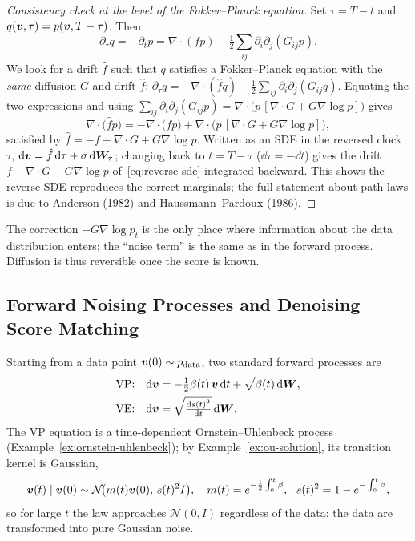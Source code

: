 \begin{proof}[Consistency check at the level of the Fokker--Planck equation]
Set $\tau=T-t$ and $q(\bm{v},\tau)=p(\bm{v},T-\tau)$. Then
\[
\partial_\tau q=-\partial_tp=\nabla\!\cdot(fp)-\tfrac12\sum_{ij}\partial_i\partial_j(G_{ij}p).
\]
We look for a drift $\hat f$ such that $q$ satisfies a Fokker--Planck equation with the \emph{same} diffusion $G$ and drift $\hat f$:
$\partial_\tau q=-\nabla\!\cdot(\hat fq)+\tfrac12\sum_{ij}\partial_i\partial_j(G_{ij}q)$. Equating the two expressions and using $\sum_{ij}\partial_i\partial_j(G_{ij}p)=\nabla\!\cdot\big(p\,[\nabla\!\cdot G+G\nabla\log p]\big)$ gives
\[
\nabla\!\cdot\big(\hat fp\big)=-\nabla\!\cdot\big(fp\big)+\nabla\!\cdot\big(p\,[\nabla\!\cdot G+G\nabla\log p]\big),
\]
satisfied by $\hat f=-f+\nabla\!\cdot G+G\nabla\log p$. Written as an SDE in the reversed clock $\tau$, $\mathrm{d}\bm{v}=\hat f\,\mathrm{d}\tau+\sigma\,\mathrm{d}\bm{W}_\tau$; changing back to $t=T-\tau$ ($\dd\tau=-\dd t$) gives the drift $f-\nabla\!\cdot G-G\nabla\log p$ of~\eqref{eq:reverse-sde} integrated backward. This shows the reverse SDE reproduces the correct marginals; the full statement about path laws is due to Anderson (1982) and Haussmann--Pardoux (1986).
\end{proof}

\noindent The correction $-G\nabla\log p_t$ is the only place where information about the data distribution enters; the ``noise term'' is the same as in the forward process. Diffusion is thus reversible once the score is known.

\subsection{Forward Noising Processes and Denoising Score Matching}

\begin{definition}
\label{def:vp-ve}
Starting from a data point $\bm{v}(0)\sim p_{\mathrm{data}}$, two standard forward processes are
\begin{align}
\text{VP:}\quad &\mathrm{d}\bm{v}=-\tfrac12\beta(t)\,\bm{v}\,\mathrm{d} t+\sqrt{\beta(t)}\,\mathrm{d}\bm{W},\\
\text{VE:}\quad &\mathrm{d}\bm{v}=\sqrt{\tfrac{\mathrm{d} s(t)^2}{\mathrm{d} t}}\,\mathrm{d}\bm{W} .
\end{align}
The VP equation is a time-dependent Ornstein--Uhlenbeck process (Example~\ref{ex:ornstein-uhlenbeck}); by Example~\ref{ex:ou-solution}, its transition kernel is Gaussian,
\[
\bv(t)\mid\bv(0)\sim\mathcal N\!\big(m(t)\bv(0),\,s(t)^2I\big),\quad m(t)=e^{-\frac12\int_0^t\beta},\ \ s(t)^2=1-e^{-\int_0^t\beta},
\]
so for large $t$ the law approaches $\mathcal N(0,I)$ regardless of the data: the data are transformed into pure Gaussian noise.
\end{definition}

